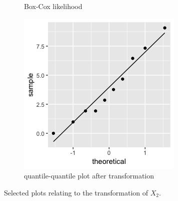 \begin{enumerate}
\begin{figure}[H]
\begin{subfigure}{.33\textwidth}
  \caption{Box-Cox likelihood}
  \label{fig:sfig2}
\end{subfigure}
\begin{subfigure}{.33\textwidth}
  \centering
	\includegraphics[width=.8\linewidth]{plot_4_30_b_qqnew.png}
  \caption{quantile-quantile plot after transformation}
  \label{fig:sfig2}
\end{subfigure}
\caption{Selected plots relating to the transformation of $X_2$.}
\end{figure}


\end{enumerate}
